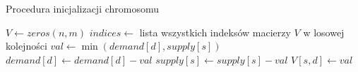 \begin{pseudokod}[H]
    \label{inicjalizacja-1}
    \caption{Procedura inicjalizacji chromosomu}
    \BlankLine
    $V \gets zeros(n, m)$
    $indices \gets$ lista wszystkich indeksów macierzy $V$ w losowej kolejności\;
    \BlankLine
     {
        $val \gets \min(demand[d], supply[s])$\;
        $demand[d] \gets demand[d] - val$\;
        $supply[s] \gets supply[s] - val$\;
        $V[s, d] \gets val$\;
    }

\end{pseudokod}

